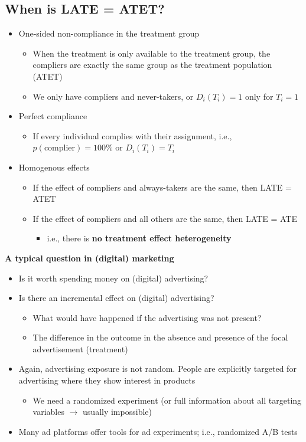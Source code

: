 \documentclass[10pt]{article}
\begin{document}
\subsection{When is LATE = ATET?}
\begin{itemize}
    \item One-sided non-compliance in the treatment group 
    \begin{itemize}
        \item When the treatment is only available to the treatment group, the compliers are exactly the same group as the treatment population (ATET)
        \item We only have compliers and never-takers, or $D_i(T_i) = 1 $ only for $T_i = 1 $
    \end{itemize}
    \item Perfect compliance 
    \begin{itemize}
        \item If every individual complies with their assignment, i.e., $p(\text{complier}) = 100\% $ or $D_i(T_i) = T_i $
    \end{itemize}
    \item Homogenous effects 
    \begin{itemize}
        \item If the effect of compliers and always-takers are the same, then LATE = ATET
        \item If the effect of compliers and all others are the same, then LATE = ATE 
        \begin{itemize}
            \item i.e., there is \textbf{no treatment effect heterogeneity}
        \end{itemize}
    \end{itemize}
\end{itemize}
\textbf{A typical question in (digital) marketing}
\begin{itemize}
    \item Is it worth spending money on (digital) advertising?
    \item Is there an incremental effect on (digital) advertising?
    \begin{itemize}
        \item What would have happened if the advertising was not present?
        \item The difference in the outcome in the absence and presence of the focal advertisement (treatment)
    \end{itemize}
    \item Again, advertising exposure is not random. People are explicitly targeted for advertising where they show interest in products 
    \begin{itemize}
        \item We need a randomized experiment (or full information about all targeting variables $\to $ usually impossible)
    \end{itemize}
    \item Many ad platforms offer tools for ad experiments; i.e., randomized A/B tests
\end{itemize}
\end{document}
